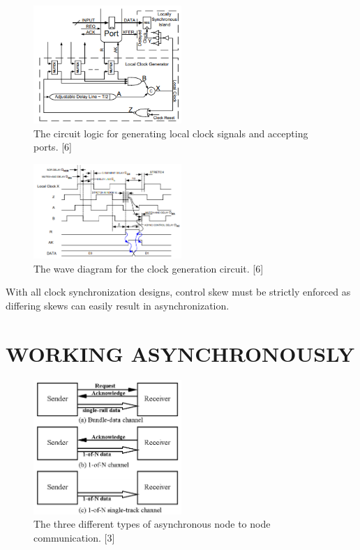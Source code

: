 \documentclass[letterpaper, 10 pt, conference]{ieeeconf}
\begin{document}
\begin{figure}[!ht] %
	\centering
	\includegraphics [width=0.5\textwidth] {Clock_Generation.PNG} 
    \caption{The circuit logic for generating local clock signals and accepting ports. [6]}

\end{figure}

\begin{figure}[!ht] %
	\centering
	\includegraphics [width=0.5\textwidth] {Wave_Diagram_Clock_Generation.PNG} 
    \caption{The wave diagram for the clock generation circuit. [6]}
\end{figure}

With all clock synchronization designs, control skew must be strictly enforced as differing skews can easily result in asynchronization.

\section{WORKING ASYNCHRONOUSLY}

\begin{figure}[!ht] %
	\centering
	\includegraphics [width=0.5\textwidth] {Asyc_Channel.PNG} 
    \caption{The three different types of asynchronous node to node communication. [3]}
\end{figure}
\end{document}

